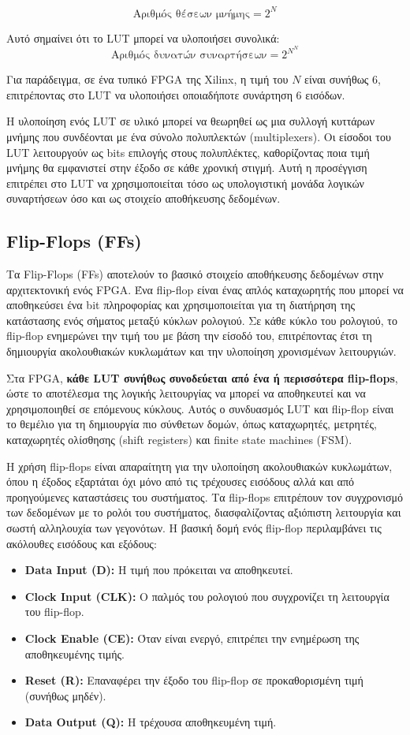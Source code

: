 \[
\text{Αριθμός θέσεων μνήμης} = 2^N
\]

Αυτό σημαίνει ότι το LUT μπορεί να υλοποιήσει συνολικά:
\[
\text{Αριθμός δυνατών συναρτήσεων} = 2^{N^N}
\]


Για παράδειγμα, σε ένα τυπικό FPGA της Xilinx, η τιμή του \(N\) είναι συνήθως 6, επιτρέποντας στο LUT να υλοποιήσει οποιαδήποτε συνάρτηση 6 εισόδων.

Η υλοποίηση ενός LUT σε υλικό μπορεί να θεωρηθεί ως μια συλλογή κυττάρων μνήμης που συνδέονται με ένα σύνολο πολυπλεκτών (multiplexers). Οι είσοδοι του LUT λειτουργούν ως bits επιλογής στους πολυπλέκτες, καθορίζοντας ποια τιμή μνήμης θα εμφανιστεί στην έξοδο σε κάθε χρονική στιγμή. Αυτή η προσέγγιση επιτρέπει στο LUT να χρησιμοποιείται τόσο ως υπολογιστική μονάδα λογικών συναρτήσεων όσο και ως στοιχείο αποθήκευσης δεδομένων.

\subsection{Flip-Flops (FFs)}

Τα Flip-Flops (FFs) αποτελούν το βασικό στοιχείο αποθήκευσης δεδομένων στην αρχιτεκτονική ενός FPGA. Ένα flip-flop είναι ένας απλός καταχωρητής που μπορεί να αποθηκεύσει ένα bit πληροφορίας και χρησιμοποιείται για τη διατήρηση της κατάστασης ενός σήματος μεταξύ κύκλων ρολογιού. Σε κάθε κύκλο του ρολογιού, το flip-flop ενημερώνει την τιμή του με βάση την είσοδό του, επιτρέποντας έτσι τη δημιουργία ακολουθιακών κυκλωμάτων και την υλοποίηση χρονισμένων λειτουργιών.

Στα FPGA, \textbf{κάθε LUT συνήθως συνοδεύεται από ένα ή περισσότερα flip-flops}, ώστε το αποτέλεσμα της λογικής λειτουργίας να μπορεί να αποθηκευτεί και να χρησιμοποιηθεί σε επόμενους κύκλους. Αυτός ο συνδυασμός LUT και flip-flop είναι το θεμέλιο για τη δημιουργία πιο σύνθετων δομών, όπως καταχωρητές, μετρητές, καταχωρητές ολίσθησης (shift registers) και finite state machines (FSM).

Η χρήση flip-flops είναι απαραίτητη για την υλοποίηση ακολουθιακών κυκλωμάτων, όπου η έξοδος εξαρτάται όχι μόνο από τις τρέχουσες εισόδους αλλά και από προηγούμενες καταστάσεις του συστήματος. Τα flip-flops επιτρέπουν τον συγχρονισμό των δεδομένων με το ρολόι του συστήματος, διασφαλίζοντας αξιόπιστη λειτουργία και σωστή αλληλουχία των γεγονότων.
Η βασική δομή ενός flip-flop περιλαμβάνει τις ακόλουθες εισόδους και εξόδους:
\begin{itemize}
  \item \textbf{Data Input (D):} Η τιμή που πρόκειται να αποθηκευτεί.
  \item \textbf{Clock Input (CLK):} Ο παλμός του ρολογιού που συγχρονίζει τη λειτουργία του flip-flop.
  \item \textbf{Clock Enable (CE):} Όταν είναι ενεργό, επιτρέπει την ενημέρωση της αποθηκευμένης τιμής.
  \item \textbf{Reset (R):} Επαναφέρει την έξοδο του flip-flop σε προκαθορισμένη τιμή (συνήθως μηδέν).
  \item \textbf{Data Output (Q):} Η τρέχουσα αποθηκευμένη τιμή.
\end{itemize}

